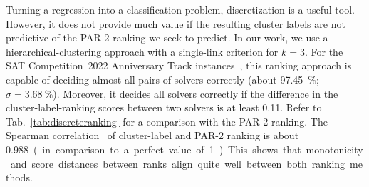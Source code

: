\documentclass[runningheads]{llncs}
\begin{document}
Turning a regression into a classification problem, discretization is a useful tool.
However, it does not provide much value if the resulting cluster labels are not predictive of the PAR-2 ranking we seek to predict.
In our work, we use a hierarchical-clustering approach with a single-link criterion for $k = 3$.
For the SAT Competition~2022 Anniversary Track instances~\cite{sat2022}, this ranking approach is capable of deciding almost all pairs of solvers correctly (about \SI{97.45}{\%}; $\sigma = \SI{3.68}{\%}$).
Moreover, it decides all solvers correctly if the difference in the cluster-label-ranking scores between two solvers is at least \SI{0.11}{}.
Refer to Tab.~\ref{tab:discreteranking} for a comparison with the PAR-2 ranking.
The Spearman correlation~\cite{de2016comparing} of cluster-label and PAR-2 ranking is about \SI{0.988} (in comparison to a perfect value of \SI{1}). This shows that monotonicity and score distances between ranks align quite well between both ranking methods.

\end{document}
